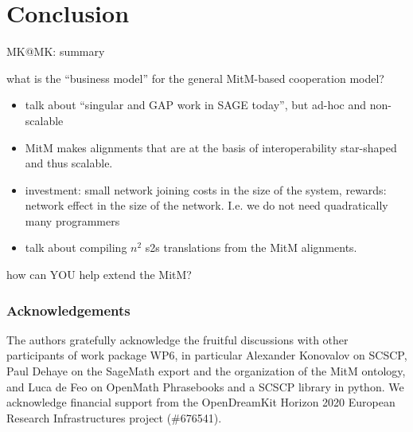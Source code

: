 \section{Conclusion}\label{sec:concl}
\begin{todolist}{MK@MK: summary}
\item what is the ``business model'' for the general MitM-based cooperation model?
  \begin{itemize}
  \item talk about ``singular and GAP work in SAGE today'', but ad-hoc and non-scalable 
  \item MitM makes alignments that are at the basis of interoperability star-shaped and
    thus scalable.
  \item investment: small network joining costs in the size of the system, rewards:
    network effect in the size of the network. I.e. we do not need quadratically many
    programmers
  \item talk about compiling $n^2$ s2s translations from the MitM alignments. 
  \end{itemize}
\item how can YOU help extend the MitM?
\end{todolist}

\subsubsection*{Acknowledgements}
The authors gratefully acknowledge the fruitful discussions with other participants of
work package WP6, in particular Alexander Konovalov on SCSCP, Paul Dehaye on the SageMath
export and the organization of the MitM ontology, and Luca de Feo on OpenMath Phrasebooks
and a SCSCP library in python.  We acknowledge financial support from the OpenDreamKit
Horizon 2020 European Research Infrastructures project (\#676541).


